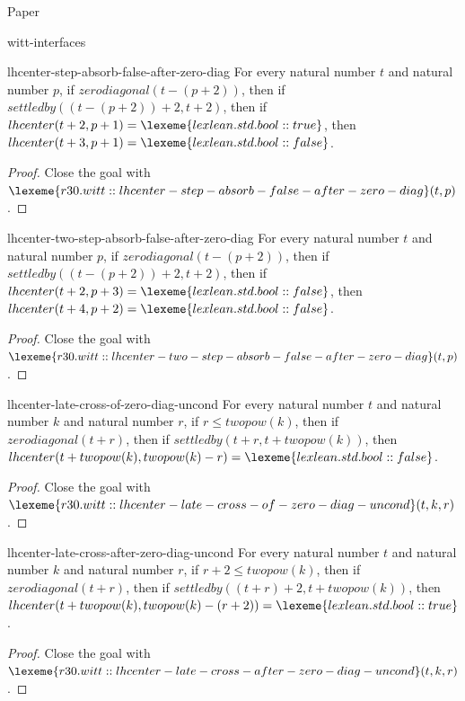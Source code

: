 \begin{lexlean}{Paper}
\begin{section}{witt-interfaces}
  \begin{theorem}{lhcenter-step-absorb-false-after-zero-diag}
  For every natural number \(t\) and natural number \(p\), if \(zerodiagonal(t - (p + 2))\), then if \(settledby((t - (p + 2)) + 2, t + 2)\), then if \(lhcenter(t + 2, p + 1) = \lexeme{lexlean.std.bool::true}\), then \(lhcenter(t + 3, p + 1) = \lexeme{lexlean.std.bool::false}\).
  \begin{proof}
  Close the goal with \(\lexeme{r30.witt::lhcenter-step-absorb-false-after-zero-diag}(t, p)\).
  \end{proof}
  \end{theorem}

  \begin{theorem}{lhcenter-two-step-absorb-false-after-zero-diag}
  For every natural number \(t\) and natural number \(p\), if \(zerodiagonal(t - (p + 2))\), then if \(settledby((t - (p + 2)) + 2, t + 2)\), then if \(lhcenter(t + 2, p + 3) = \lexeme{lexlean.std.bool::false}\), then \(lhcenter(t + 4, p + 2) = \lexeme{lexlean.std.bool::false}\).
  \begin{proof}
  Close the goal with \(\lexeme{r30.witt::lhcenter-two-step-absorb-false-after-zero-diag}(t, p)\).
  \end{proof}
  \end{theorem}

  \begin{theorem}{lhcenter-late-cross-of-zero-diag-uncond}
  For every natural number \(t\) and natural number \(k\) and natural number \(r\), if \(r ≤ twopow(k)\), then if \(zerodiagonal(t + r)\), then if \(settledby(t + r, t + twopow(k))\), then \(lhcenter(t + twopow(k), twopow(k) - r) = \lexeme{lexlean.std.bool::false}\).
  \begin{proof}
  Close the goal with \(\lexeme{r30.witt::lhcenter-late-cross-of-zero-diag-uncond}(t, k, r)\).
  \end{proof}
  \end{theorem}

  \begin{theorem}{lhcenter-late-cross-after-zero-diag-uncond}
  For every natural number \(t\) and natural number \(k\) and natural number \(r\), if \(r + 2 ≤ twopow(k)\), then if \(zerodiagonal(t + r)\), then if \(settledby((t + r) + 2, t + twopow(k))\), then \(lhcenter(t + twopow(k), twopow(k) - (r + 2)) = \lexeme{lexlean.std.bool::true}\).
  \begin{proof}
  Close the goal with \(\lexeme{r30.witt::lhcenter-late-cross-after-zero-diag-uncond}(t, k, r)\).
  \end{proof}
  \end{theorem}


\end{section}
\end{lexlean}
